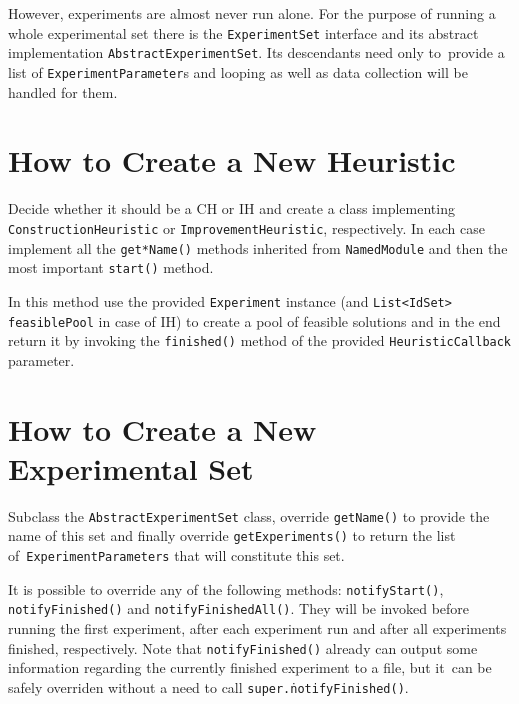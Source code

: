 However, experiments are almost never run alone. For the purpose of running a whole experimental set there is the \texttt{Experiment\-Set} interface and its abstract implementation \texttt{Abstract\-Experiment\-Set}. Its descendants need only to~provide a list of \texttt{Experiment\-Parameter}s and looping as well as data collection will be handled for them.

\section{How to Create a New Heuristic}
\label{section-appendix-iss-howto}

Decide whether it should be a CH or IH and create a class implementing \texttt{Con\-struc\-tion\-Heu\-ris\-tic} or \texttt{Im\-prove\-ment\-Heu\-ris\-tic}, respectively. In each case implement all the \texttt{get*Name()} methods inherited from \texttt{Named\-Module} and then the most important \texttt{start()} method.

In this method use the provided \texttt{Experiment} instance (and \texttt{List<IdSet> feasiblePool} in case of IH) to create a pool of feasible solutions and in the end return it by invoking the \texttt{finished()} method of the provided \texttt{Heuristic\-Callback} parameter.

\section{How to Create a New Experimental Set}

Subclass the \texttt{Abstract\-Experiment\-Set} class, override \texttt{get\-Name()} to provide the name of this set and finally override \texttt{get\-Experiments()} to return the list of~\texttt{Ex\-per\-i\-ment\-Parameters} that will constitute this set.

It is possible to override any of the following methods: \texttt{notify\-Start()}, \texttt{notify\-Finished()} and \texttt{notify\-Finished\-All()}. They will be invoked before running the first experiment, after each experiment run and after all experiments finished, respectively. Note that \texttt{notify\-Finished()} already can output some information regarding the currently finished experiment to a file, but it~can be safely overriden without a need to call \texttt{super.\.notify\-Finished()}.